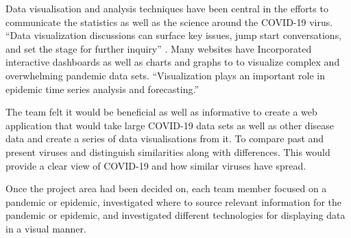 \vspace{5mm} %

Data visualisation and analysis techniques have been central in the efforts to communicate the statistics as well as the science around the COVID-19 virus. 
“Data visualization discussions can surface key issues, jump start conversations, and set the stage for further inquiry” \cite{fontichiaro2021using}. Many websites have Incorporated interactive dashboards as well as charts and graphs to to visualize complex and overwhelming pandemic data sets. 
“Visualization plays an important role in epidemic time series analysis and forecasting.”\cite{thorve2018epiviewer}

\vspace{5mm} %

The team felt it would be beneficial as well as informative to create a web application that would take large COVID-19 data sets as well as other disease data and create a series of data visualisations from it. To compare past and present viruses and distinguish similarities along with differences. This would provide a clear view of COVID-19 and how similar viruses have spread.

\vspace{3mm} %
Once the project area had been decided on, each team member focused on a pandemic or epidemic, investigated where to source relevant information for the pandemic or epidemic, and investigated different technologies for displaying data in a visual manner.

\vspace{5mm}

